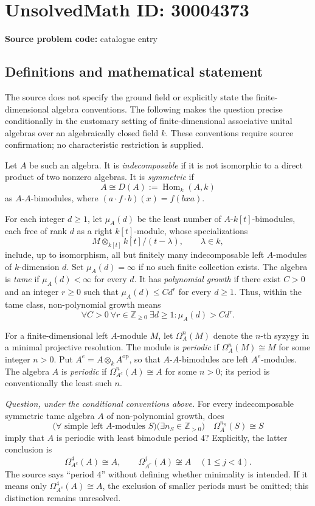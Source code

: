 \documentclass[11pt]{article}
\newcommand{\Z}{\mathbb{Z}}
\begin{document}
\section*{UnsolvedMath ID: 30004373}
\textbf{Source problem code:} catalogue entry
\subsection{Definitions and mathematical statement}
The source does not specify the ground field or explicitly state the finite-dimensional algebra conventions. The following makes the question precise conditionally in the customary setting of finite-dimensional associative unital algebras over an algebraically closed field \(k\). These conventions require source confirmation; no characteristic restriction is supplied.

Let \(A\) be such an algebra. It is \emph{indecomposable} if it is not isomorphic to a direct product of two nonzero algebras. It is \emph{symmetric} if
\[
 A\cong D(A):=\operatorname{Hom}_k(A,k)
\]
as \(A\)-\(A\)-bimodules, where \((a\cdot f\cdot b)(x)=f(bxa)\).

For each integer \(d\geq 1\), let \(\mu_A(d)\) be the least number of \(A\)-\(k[t]\)-bimodules, each free of rank \(d\) as a right \(k[t]\)-module, whose specializations
\[
 M\otimes_{k[t]} k[t]/(t-\lambda),\qquad \lambda\in k,
\]
include, up to isomorphism, all but finitely many indecomposable left \(A\)-modules of \(k\)-dimension \(d\). Set \(\mu_A(d)=\infty\) if no such finite collection exists. The algebra is \emph{tame} if \(\mu_A(d)<\infty\) for every \(d\). It has \emph{polynomial growth} if there exist \(C>0\) and an integer \(r\geq0\) such that \(\mu_A(d)\leq C d^r\) for every \(d\geq1\). Thus, within the tame class, non-polynomial growth means
\[
 \forall C>0\ \forall r\in\Z_{\geq0}\ \exists d\geq1:
 \mu_A(d)>C d^r.
\]

For a finite-dimensional left \(A\)-module \(M\), let \(\Omega_A^n(M)\) denote the \(n\)-th syzygy in a minimal projective resolution. The module is \emph{periodic} if \(\Omega_A^n(M)\cong M\) for some integer \(n>0\). Put \(A^e=A\otimes_k A^{\mathrm{op}}\), so that \(A\)-\(A\)-bimodules are left \(A^e\)-modules. The algebra \(A\) is \emph{periodic} if \(\Omega_{A^e}^n(A)\cong A\) for some \(n>0\); its period is conventionally the least such \(n\).

\emph{Question, under the conditional conventions above.} For every indecomposable symmetric tame algebra \(A\) of non-polynomial growth, does
\[
 \bigl(\forall\text{ simple left }A\text{-modules }S\bigr)
 \bigl(\exists n_S\in\Z_{>0}\bigr)\quad
 \Omega_A^{n_S}(S)\cong S
\]
imply that \(A\) is periodic with least bimodule period \(4\)? Explicitly, the latter conclusion is
\[
 \Omega_{A^e}^{4}(A)\cong A,
 \qquad
 \Omega_{A^e}^{j}(A)\not\cong A\quad(1\leq j<4).
\]
The source says ``period \(4\)'' without defining whether minimality is intended. If it means only \(\Omega_{A^e}^{4}(A)\cong A\), the exclusion of smaller periods must be omitted; this distinction remains unresolved.
\end{document}
